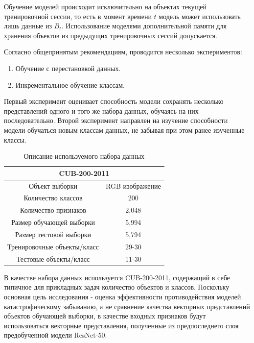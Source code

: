 \documentclass[a4paper,article,14pt]{extarticle}
\begin{document}
Обучение моделей происходит исключительно на объектах текущей тренировочной 
сессии, то есть в момент времени \(t\) модель может использовать лишь данные из 
\(B_t\). Использование моделями дополнительной памяти для хранения объектов из 
предыдущих тренировочных сессий допускается.

Согласно общепринятым рекомендациям, проводится несколько экспериментов:
\begin{enumerate}
    \item Обучение с перестановкой данных.
    \item Инкрементальное обучение классам.
\end{enumerate}
Первый эксперимент оценивает способность модели сохранять несколько 
представлений одного и того же набора данных, обучаясь на них последовательно.
Второй эксперимент направлен на изучение способности модели обучаться новым 
классам данных, не забывая при этом ранее изученные классы. 

\begin{table}[h!]
\begin{center}
\begin{tabular}{ |c|c|  }
 \hline
 \multicolumn{2}{|c|}{CUB-200-2011} \\
 \hline
 Объект выборки & RGB изображение \\
 \hline
 Количество классов & 200 \\
 \hline
 Количество признаков & 2,048 \\
 \hline
 Размер обучающей выборки & 5,994 \\
 \hline
 Размер тестовой выборки & 5,794 \\
 \hline
 Тренировочные объекты/класс & 29-30 \\
 \hline
 Тестовые объекты/класс & 11-30 \\
 \hline
\end{tabular}
\caption{Описание используемого набора данных}
\label{tab:dataset}
\end{center}
\end{table}

В качестве набора данных используется CUB-200-2011, содержащий в себе типичное 
для прикладных задач количество объектов и классов. Поскольку основная цель 
исследования - оценка эффективности противодействия моделей катастрофическому 
забыванию, а не сравнение качества векторных представлений объектов обучающей 
выборки, в качестве входных признаков будут использоваться векторные 
представления, полученные из предпоследнего слоя предобученной модели ResNet-50.
\end{document}
